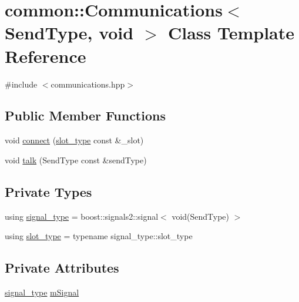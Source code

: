\hypertarget{classcommon_1_1Communications_3_01SendType_00_01void_01_4}{}\section{common\+:\+:Communications$<$ Send\+Type, void $>$ Class Template Reference}
\label{classcommon_1_1Communications_3_01SendType_00_01void_01_4}


{\ttfamily \#include $<$communications.\+hpp$>$}

\subsection*{Public Member Functions}
\begin{DoxyCompactItemize}
\item 
void \mbox{\hyperlink{classcommon_1_1Communications_3_01SendType_00_01void_01_4_a421016a95514d984951d538a6f24223d}{connect}} (\mbox{\hyperlink{classcommon_1_1Communications_3_01SendType_00_01void_01_4_afd0ffbe5cd762b7a03402664b19a69aa}{slot\+\_\+type}} const \&\+\_\+slot)
\item 
void \mbox{\hyperlink{classcommon_1_1Communications_3_01SendType_00_01void_01_4_aa23c4fc34c4862dee8dc95e62f1c76e3}{talk}} (Send\+Type const \&send\+Type)
\end{DoxyCompactItemize}
\subsection*{Private Types}
\begin{DoxyCompactItemize}
\item 
using \mbox{\hyperlink{classcommon_1_1Communications_3_01SendType_00_01void_01_4_a9bae0c78acbf37200d02670f0b978120}{signal\+\_\+type}} = boost\+::signals2\+::signal$<$ void(Send\+Type) $>$
\item 
using \mbox{\hyperlink{classcommon_1_1Communications_3_01SendType_00_01void_01_4_afd0ffbe5cd762b7a03402664b19a69aa}{slot\+\_\+type}} = typename signal\+\_\+type\+::slot\+\_\+type
\end{DoxyCompactItemize}
\subsection*{Private Attributes}
\begin{DoxyCompactItemize}
\item 
\mbox{\hyperlink{classcommon_1_1Communications_3_01SendType_00_01void_01_4_a9bae0c78acbf37200d02670f0b978120}{signal\+\_\+type}} \mbox{\hyperlink{classcommon_1_1Communications_3_01SendType_00_01void_01_4_a72b8aa8455e087419d92642f77ea0cf4}{m\+Signal}}
\end{DoxyCompactItemize}


